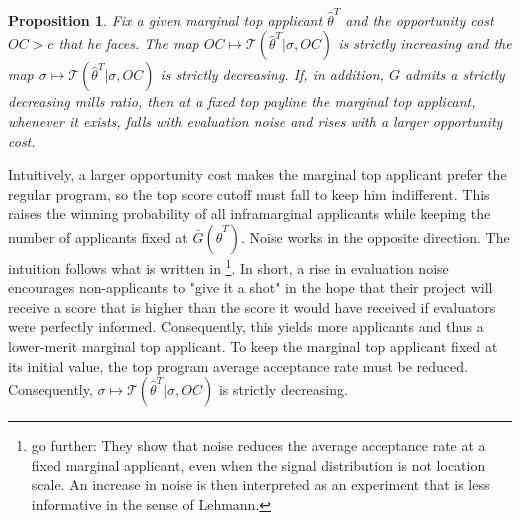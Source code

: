 \documentclass[12pt,reqno]{amsart}
\newtheorem{proposition}{Proposition}
\theoremstyle{definition}
\theoremstyle{plain} %
\begin{document}
\begin{proposition}\label{prop:topmarginal_cost_noise}
Fix a given marginal top applicant $\hat{\theta}^T$ and the opportunity cost $OC>c$ that he faces. The map $OC\mapsto \mathcal{T}(\hat{\theta}^T|\sigma,OC)$ is strictly increasing and the map $\sigma\mapsto \mathcal{T}(\hat{\theta}^T|\sigma,OC)$ is strictly decreasing. If, in addition, $G$ admits a strictly decreasing mills ratio, then at a fixed top payline the marginal top applicant, whenever it exists, falls with evaluation noise and rises with a larger opportunity cost.
\end{proposition}

\noindent Intuitively, a larger opportunity cost makes the marginal top applicant prefer the regular program, so the top score cutoff must fall to keep him indifferent. This raises the winning probability of all inframarginal applicants while keeping the number of applicants fixed at $\bar{G}(\hat{\theta}^T)$. Noise works in the opposite direction. The intuition follows what is written in \citet{adda2024grantmaking}\footnote{\citet{adda2024grantmaking} go further: They show that noise reduces the average acceptance rate at a fixed marginal applicant, even when the signal distribution is not location scale. An increase in noise is then interpreted as an experiment that is less informative in the sense of Lehmann. }. In short, a rise in evaluation noise encourages non-applicants to "give it a shot" in the hope that their project will receive a score that is higher than the score it would have received if evaluators were perfectly informed. Consequently, this yields more applicants and thus a lower-merit marginal top applicant. To keep the marginal top applicant fixed at its initial value, the top program average acceptance rate must be reduced. Consequently, $\sigma\mapsto \mathcal{T}(\hat{\theta}^T|\sigma,OC)$ is strictly decreasing. 
\end{document}
